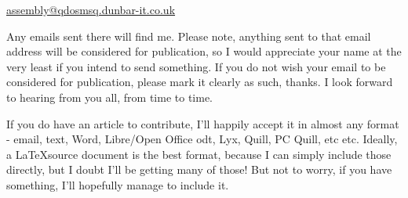 \url{assembly@qdosmsq.dunbar-it.co.uk}

Any emails sent there will find me. Please note, anything sent to that email address will be considered for publication, so I would appreciate your name at the very least if you intend to send something. If you do not wish your email to be considered for publication, please mark it clearly as such, thanks. I look forward to hearing from you all, from time to time.

If you do have an article to contribute, I'll happily accept it in almost any format - email, text, Word, Libre/Open Office odt, Lyx, Quill, PC Quill, etc etc. Ideally, a \LaTeX source document is the best format, because I
can simply include those directly, but I doubt I'll be getting many of those! But not to worry, if you have something, I'll hopefully manage to include it.
